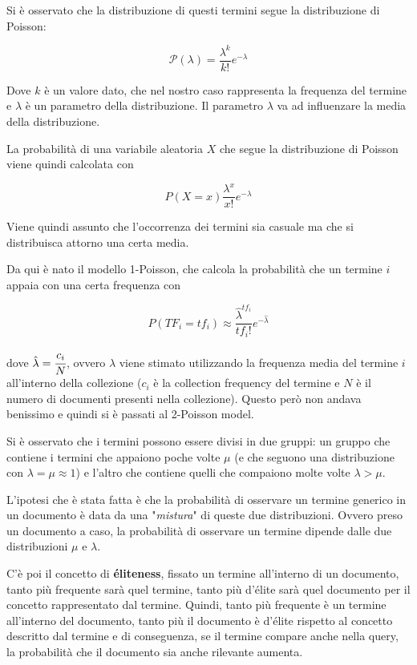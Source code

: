 Si è osservato che la distribuzione di questi termini segue la distribuzione di Poisson:

$$
\mathcal{P}(\lambda) = \frac{\lambda^k}{k!}e^{-\lambda}
$$

Dove $k$ è un valore dato, che nel nostro caso rappresenta la frequenza del termine e $\lambda$ è un parametro della distribuzione. Il parametro $\lambda$ va ad influenzare la media della distribuzione.

La probabilità di una variabile aleatoria $X$ che segue la distribuzione di Poisson viene quindi calcolata con

$$
P(X = x) \frac{\lambda^x}{x!}e^{-\lambda}
$$

Viene quindi assunto che l'occorrenza dei termini sia casuale ma che si distribuisca attorno una certa media.

Da qui è nato il modello 1-Poisson, che calcola la probabilità che un termine $i$ appaia con una certa frequenza con

$$
P(TF_i = tf_i) \approx \frac{\hat{\lambda}^{tf_i}}{{tf_i}!}e^{-\hat{\lambda}}
$$

\noindent dove $\hat{\lambda} = \cfrac{c_i}{N}$, ovvero $\lambda$ viene stimato utilizzando la frequenza media del termine $i$ all'interno della collezione ($c_i$ è la collection frequency del termine e $N$ è il numero di documenti presenti nella collezione).
Questo però non andava benissimo e quindi si è passati al 2-Poisson model.

Si è osservato che i termini possono essere divisi in due gruppi: un gruppo che contiene i termini che appaiono poche volte $\mu$ (e che seguono una distribuzione con $\lambda = \mu \approx 1$) e l'altro che contiene quelli che compaiono molte volte $\lambda > \mu$. 

L'ipotesi che è stata fatta è che la probabilità di osservare un termine generico in un documento è data da una "\textit{mistura}" di queste due distribuzioni. Ovvero preso un documento a caso, la probabilità di osservare un termine dipende dalle due distribuzioni $\mu$ e $\lambda$.

C'è poi il concetto di \textbf{éliteness}, fissato un termine all'interno di un documento, tanto più frequente sarà quel termine, tanto più d'élite sarà quel documento per il concetto rappresentato dal termine. 
Quindi, tanto più frequente è un termine all'interno del documento, tanto più il documento è d'élite rispetto al concetto descritto dal termine e di conseguenza, se il termine compare anche nella query, la probabilità che il documento sia anche rilevante aumenta.

